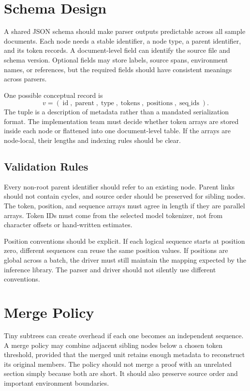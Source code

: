 \documentclass{article}
\begin{document}
\section{Schema Design}
A shared JSON schema should make parser outputs predictable across all sample documents. Each node needs a stable identifier, a node type, a parent identifier, and its token records. A document-level field can identify the source file and schema version. Optional fields may store labels, source spans, environment names, or references, but the required fields should have consistent meanings across parsers.

One possible conceptual record is
\begin{equation}
v=(\operatorname{id},\operatorname{parent},\operatorname{type},
\operatorname{tokens},\operatorname{positions},\operatorname{seq\_ids}).
\end{equation}
The tuple is a description of metadata rather than a mandated serialization format. The implementation team must decide whether token arrays are stored inside each node or flattened into one document-level table. If the arrays are node-local, their lengths and indexing rules should be clear.

\subsection{Validation Rules}
Every non-root parent identifier should refer to an existing node. Parent links should not contain cycles, and source order should be preserved for sibling nodes. The token, position, and sequence arrays must agree in length if they are parallel arrays. Token IDs must come from the selected model tokenizer, not from character offsets or hand-written estimates.

Position conventions should be explicit. If each logical sequence starts at position zero, different sequences can reuse the same position values. If positions are global across a batch, the driver must still maintain the mapping expected by the inference library. The parser and driver should not silently use different conventions.

\section{Merge Policy}
Tiny subtrees can create overhead if each one becomes an independent sequence. A merge policy may combine adjacent sibling nodes below a chosen token threshold, provided that the merged unit retains enough metadata to reconstruct its original members. The policy should not merge a proof with an unrelated section simply because both are short. It should also preserve source order and important environment boundaries.
\end{document}
